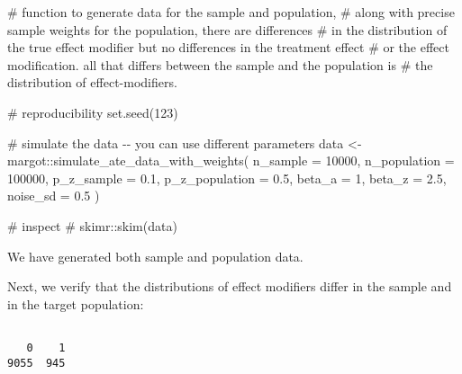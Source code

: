 \documentclass[
  single column]{article}
\newenvironment{Shaded}{\begin{snugshade}}{\end{snugshade}}
\newcommand{\AttributeTok}[1]{\textcolor[rgb]{0.40,0.45,0.13}{#1}}
\newcommand{\CommentTok}[1]{\textcolor[rgb]{0.37,0.37,0.37}{#1}}
\newcommand{\DecValTok}[1]{\textcolor[rgb]{0.68,0.00,0.00}{#1}}
\newcommand{\FloatTok}[1]{\textcolor[rgb]{0.68,0.00,0.00}{#1}}
\newcommand{\FunctionTok}[1]{\textcolor[rgb]{0.28,0.35,0.67}{#1}}
\newcommand{\NormalTok}[1]{\textcolor[rgb]{0.00,0.23,0.31}{#1}}
\newcommand{\OtherTok}[1]{\textcolor[rgb]{0.00,0.23,0.31}{#1}}
\newcommand{\SpecialCharTok}[1]{\textcolor[rgb]{0.37,0.37,0.37}{#1}}
\begin{document}
\begin{Shaded}
\begin{Highlighting}[]
\CommentTok{\# function to generate data for the sample and population, }
\CommentTok{\# along with precise sample weights for the population, there are differences }
\CommentTok{\# in the distribution of the true effect modifier but no differences in the treatment effect }
\CommentTok{\# or the effect modification. all that differs between the sample and the population is }
\CommentTok{\# the distribution of effect{-}modifiers.}

\CommentTok{\# reproducibility}
\FunctionTok{set.seed}\NormalTok{(}\DecValTok{123}\NormalTok{)}

\CommentTok{\# simulate the data {-}{-} you can use different parameters}
\NormalTok{data }\OtherTok{\textless{}{-}}\NormalTok{ margot}\SpecialCharTok{::}\FunctionTok{simulate\_ate\_data\_with\_weights}\NormalTok{(}
  \AttributeTok{n\_sample =} \DecValTok{10000}\NormalTok{,}
  \AttributeTok{n\_population =} \DecValTok{100000}\NormalTok{,}
  \AttributeTok{p\_z\_sample =} \FloatTok{0.1}\NormalTok{,}
  \AttributeTok{p\_z\_population =} \FloatTok{0.5}\NormalTok{,}
  \AttributeTok{beta\_a =} \DecValTok{1}\NormalTok{,}
  \AttributeTok{beta\_z =} \FloatTok{2.5}\NormalTok{,}
  \AttributeTok{noise\_sd =} \FloatTok{0.5}
\NormalTok{)}

\CommentTok{\# inspect}
\CommentTok{\# skimr::skim(data)}
\end{Highlighting}
\end{Shaded}

We have generated both sample and population data.

Next, we verify that the distributions of effect modifiers differ in the
sample and in the target population:

\begin{Shaded}
\end{Shaded}

\begin{verbatim}

   0    1 
9055  945 
\end{verbatim}
\end{document}
